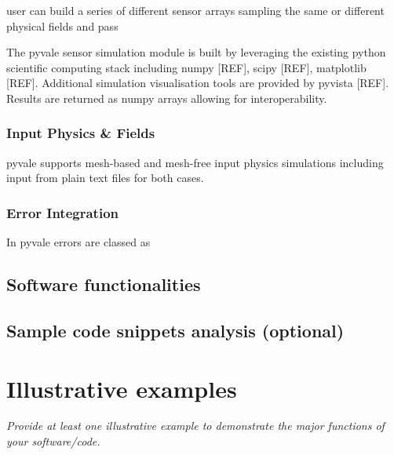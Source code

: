 \documentclass[11pt, a4paper, oneside, onecolumn]{article}
\begin{document}
user can build a series of different sensor arrays sampling the same or different physical fields and pass  

The pyvale sensor simulation module is built by leveraging the existing python scientific computing stack including numpy [REF], scipy [REF], matplotlib [REF]. Additional simulation visualisation tools are provided by pyvista [REF]. Results are returned as numpy arrays allowing for interoperability. 

\subsubsection{Input Physics & Fields}


pyvale supports mesh-based and mesh-free input physics simulations including input from plain text files for both cases. 

\subsubsection{Error Integration}


In pyvale errors are classed as 


\subsection{Software functionalities}

  
\subsection{Sample code snippets analysis (optional)}


\section{Illustrative examples}

\textit{Provide at least one illustrative example to demonstrate the major
functions of your software/code.}
\end{document}
